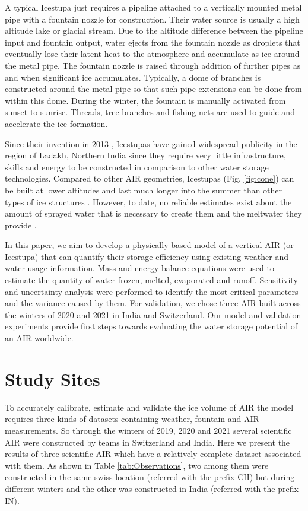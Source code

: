 \documentclass[utf8]{frontiersSCNS} %
\begin{document}
A typical Icestupa just requires a pipeline attached to a vertically mounted metal pipe with a fountain nozzle for
construction. Their water source is usually a high altitude lake or glacial stream. Due to the altitude difference
between the pipeline input and fountain output, water ejects from the fountain nozzle as droplets that eventually lose
their latent heat to the atmosphere and accumulate as ice around the metal pipe. The fountain nozzle is raised through
addition of further pipes as and when significant ice accumulates. Typically, a dome of branches is constructed around
the metal pipe so that such pipe extensions can be done from within this dome. During the winter, the fountain is
manually activated from sunset to sunrise. Threads, tree branches and fishing nets are used to guide and accelerate the
ice formation.

Since their invention in 2013 \citep{campaign}, Icestupas have gained widespread publicity in the region of Ladakh,
Northern India since they require very little infrastructure, skills and energy to be constructed in comparison to
other water storage technologies. Compared to other AIR geometries, Icestupas (Fig. \ref{fig:cone}) can be built at
lower altitudes and last much longer into the summer than other types of ice structures \citep{campaign}. However, to
date, no reliable estimates exist about the amount of sprayed water that is necessary to create them and the meltwater
they provide \citep{Nusser_2018}. 

In this paper, we aim to develop a physically-based model of a vertical AIR (or Icestupa) that can quantify their
storage efficiency using existing weather and water usage information. Mass and energy balance equations were used to
estimate the quantity of water frozen, melted, evaporated and runoff. Sensitivity and uncertainty analysis were
performed to identify the most critical parameters and the variance caused by them. For validation, we chose three AIR
built across the winters of 2020 and 2021 in India and Switzerland. Our model and validation experiments provide first
steps towards evaluating the water storage potential of an AIR worldwide. 

\section{Study Sites}
To accurately calibrate, estimate and validate the ice volume of AIR the model requires three kinds of datasets
containing weather, fountain and AIR measurements. So through the winters of 2019, 2020 and 2021 several scientific AIR
were constructed by teams in Switzerland and India. Here we present the results of three scientific AIR which have a
relatively complete dataset associated with them. As shown in Table \ref{tab:Observations}, two among them were
constructed in the same swiss location (referred with the prefix CH) but during different winters and the other was
constructed in India (referred with the prefix IN).    
\end{document}
